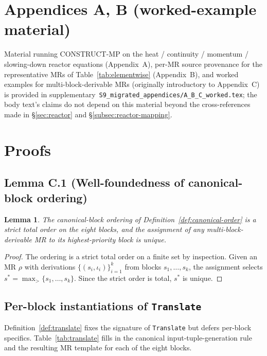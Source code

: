 \documentclass[acmsmall, screen]{acmart}
\newtheorem{lemma}{Lemma}
\begin{document}
\section*{Appendices A, B (worked-example material)}
\label{app:moved-A-B}
Material running CONSTRUCT-MP on the heat / continuity / momentum / slowing-down reactor equations (Appendix~A), per-MR source provenance for the representative MRs of Table~\ref{tab:elementwise} (Appendix~B), and worked examples for multi-block-derivable MRs (originally introductory to Appendix~C) is provided in supplementary~\texttt{S9\_migrated\_appendices/A\_B\_C\_worked.tex}; the body text's claims do not depend on this material beyond the cross-references made in \S\ref{sec:reactor} and \S\ref{subsec:reactor-mapping}.

\section{Proofs}
\label{app:proofs}

\subsection*{Lemma C.1 (Well-foundedness of canonical-block ordering)}

\begin{lemma}
\label{lem:canonical-order}
The canonical-block ordering of Definition~\ref{def:canonical-order} is a strict total order on the eight blocks, and the assignment of any multi-block-derivable MR to its highest-priority block is unique.
\end{lemma}

\begin{proof}
The ordering is a strict total order on a finite set by inspection. Given an MR $\rho$ with derivations $\{(s_i, \iota_i)\}_{i=1}^{k}$ from blocks $s_1, \ldots, s_k$, the assignment selects $s^{*} = \max_{>}\{s_1, \ldots, s_k\}$. Since the strict order is total, $s^{*}$ is unique.
\end{proof}

\subsection*{Per-block instantiations of \texttt{Translate}}
\label{app:translate-table}

Definition~\ref{def:translate} fixes the signature of \texttt{Translate} but defers per-block specifics. Table~\ref{tab:translate} fills in the canonical input-tuple-generation rule and the resulting MR template for each of the eight blocks.
\end{document}
